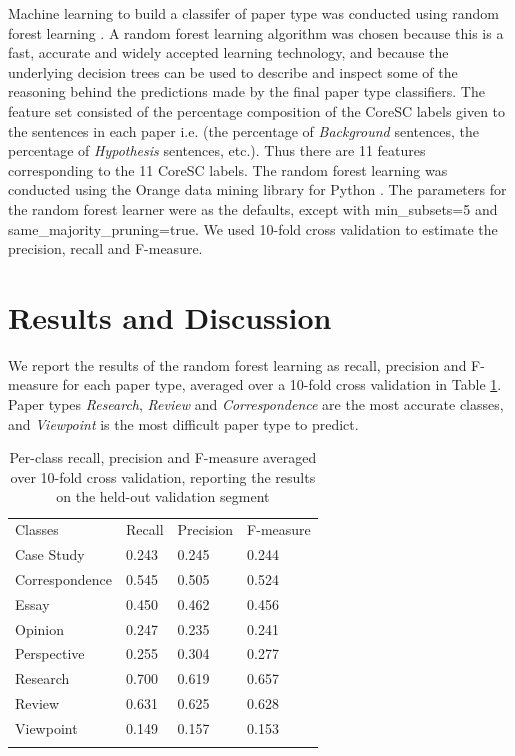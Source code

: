 \documentclass{svmult}
\begin{document}

Machine learning to build a classifer of paper type was conducted using random
forest learning \cite{Breiman2001}.  A random forest learning algorithm was
chosen because this is a fast, accurate and widely accepted learning
technology, and because the underlying decision trees can be used to describe
and inspect some of the reasoning behind the predictions made by the final
paper type classifiers.  The feature set consisted of the percentage
composition of the CoreSC labels given to the sentences in each paper i.e. (the
percentage of {\em Background} sentences, the percentage of {\em Hypothesis}
sentences, etc.).  Thus there are 11 features corresponding to the 11 CoreSC
labels.  The random forest learning was conducted using the Orange data mining
library for Python \cite{Curk2005}.  The parameters for the random forest
learner were as the defaults, except with min\_subsets=5 and same\_majority\_pruning=true.  
We used 10-fold cross validation to estimate the precision,
recall and F-measure.


\section{Results and Discussion}
\label{sec:3}

We report the results of the random forest learning as recall, precision and F-measure for each paper type, averaged over a 10-fold cross validation in Table \ref{tab:recallPrecision}. Paper types {\em Research}, {\em Review} and {\em Correspondence} are the most accurate classes, and {\em Viewpoint} is the most difficult paper type to predict. 

\begin{table}
\caption{Per-class recall, precision and F-measure averaged over 10-fold cross validation, reporting the results on the held-out validation segment}
\label{tab:recallPrecision}       %
\begin{tabular}{p{2cm}p{2.4cm}p{2cm}p{4.9cm}}
\hline\noalign{\smallskip}
Classes & Recall & Precision & F-measure  \\
\noalign{\smallskip}\svhline\noalign{\smallskip}
Case Study   &     0.243    &    0.245     &   0.244 \\
Correspondence  &      0.545    &    0.505    &    0.524 \\ 
Essay     &   0.450     &   0.462    &    0.456 \\
Opinion   &     0.247    &    0.235  &      0.241 \\   
Perspective &       0.255  &      0.304  &       0.277 \\
Research     &   0.700    &    0.619    &    0.657 \\
Review      &  0.631     &   0.625     &   0.628 \\
Viewpoint   &     0.149     &   0.157  &      0.153 \\
\noalign{\smallskip}\hline\noalign{\smallskip}
\end{tabular}
\end{table}
\end{document}
